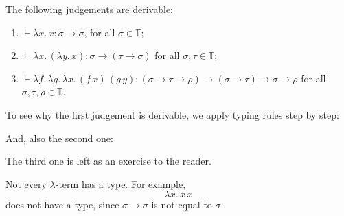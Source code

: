 \begin{example}
  The following judgements are derivable:
  \begin{enumerate}
    \item $\vdash \lambda x.\, x : \sigma \to \sigma$, for all $\sigma \in
      \mathbb{T}$;
    \item $ \vdash \lambda x.\, (\lambda y.\, x) : \sigma \to (\tau \to \sigma)$
      for all $\sigma, \tau\in\mathbb{T}$;
    \item $\vdash \lambda f.\,\lambda g.\, \lambda x.\, (f\,x)\, (g\,y) 
      : (\sigma \to \tau \to \rho) \to (\sigma\to\tau) \to \sigma\to\rho$
      for all $\sigma, \tau, \rho \in \mathbb{T}$.
  \end{enumerate}
\end{example}
To see why the first judgement is derivable, we apply typing rules
step by step:
\begin{prooftree}
\end{prooftree}
And, also the second one:
\begin{prooftree}
\end{prooftree}
The third one is left as an exercise to the reader.

\begin{example}
  Not every $\lambda$-term has a type. For example,
  \[
    \lambda x.\, x\,x
  \]
  does not have a type, since $\sigma \to \sigma$ is not equal to $\sigma$.
\end{example}



